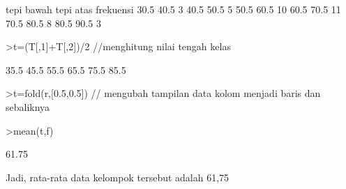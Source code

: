 \documentclass[a4paper,10pt]{article}
\begin{document}
\begin{eulernotebook}
\begin{eulercomment}
\begin{eulercomment}
\begin{eulercomment}
\begin{eulercomment}
\begin{eulercomment}
\begin{eulercomment}
\begin{eulercomment}
\begin{eulercomment}
\begin{eulercomment}
\begin{eulercomment}
\begin{eulercomment}
\begin{eulercomment}
\begin{eulercomment}
\begin{eulercomment}
\begin{euleroutput}
   tepi bawah tepi atas frekuensi
         30.5      40.5         3
         40.5      50.5         5
         50.5      60.5        10
         60.5      70.5        11
         70.5      80.5         8
         80.5      90.5         3
\end{euleroutput}
\begin{eulerprompt}
>t=(T[,1]+T[,2])/2  //menghitung nilai tengah kelas
\end{eulerprompt}
\begin{euleroutput}
           35.5 
           45.5 
           55.5 
           65.5 
           75.5 
           85.5 
\end{euleroutput}
\begin{eulerprompt}
>t=fold(r,[0.5,0.5]) // mengubah tampilan data kolom menjadi baris dan sebaliknya
\end{eulerprompt}
\begin{euleroutput}
  [35.5,  45.5,  55.5,  65.5,  75.5,  85.5]
\end{euleroutput}
\begin{eulerprompt}
>mean(t,f)
\end{eulerprompt}
\begin{euleroutput}
  61.75
\end{euleroutput}
\begin{eulercomment}
Jadi, rata-rata data kelompok tersebut adalah 61,75


\end{eulercomment}
\end{eulercomment}
\end{eulercomment}
\end{eulercomment}
\end{eulercomment}
\end{eulercomment}
\end{eulercomment}
\end{eulercomment}
\end{eulercomment}
\end{eulercomment}
\end{eulercomment}
\end{eulercomment}
\end{eulercomment}
\end{eulercomment}
\end{eulercomment}
\end{eulernotebook}
\end{document}
